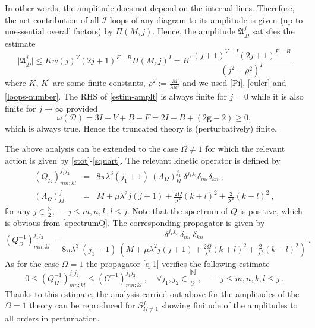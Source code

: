 \documentclass[a4paper,11pt,twoside]{article}
\numberwithin{equation}{section}
\theoremstyle{nonumberplain}
\newcounter{and}
\begin{document}
%
In other words, the amplitude does not depend on the internal lines. Therefore, the net contribution of all $\mathcal{I}$ loops of any diagram to its amplitude is given (up to unessential overall factors) by $\Pi(M,j)$. Hence, the amplitude $\mathfrak{A}^j_\mathcal{D}$ satisfies the estimate%
%
\begin{equation}
\vert \mathfrak{A}^j_{\mathcal{D}}\vert \le K w(j)^V (2j+1)^{F-B} \Pi(M,j)^I =K^\prime\frac{(j+1)^{V-I}(2j+1)^{F-B}}{(j^2+\rho^2)^{I}}\label{estim-amplt}
\end{equation}
%
where $K$, $K^\prime$ are some finite constants, $\rho^2:=\frac{M}{\lambda\mu^2}$ and we used \eqref{Pi}, \eqref{euler} and \eqref{loops-number}. The RHS of \eqref{estim-amplt} is always finite for $j=0$ while it is also finite for $j\to\infty$ provided%
%
\begin{equation}
\omega(\mathcal{D})=3I-V+B-F=2I+B+(2\mathbf{g}-2)\ge0,\label{power-count}
\end{equation}
%
which is always true. Hence the truncated theory is (perturbatively) finite.\par%
%

The above analysis can be extended to the case $\Omega\ne1$ for which the relevant action is given by \eqref{stot}-\eqref{squart}. The relevant kinetic operator is defined by%
%
\begin{eqnarray}
\left(Q_\Omega\right)^{j_1j_2}_{mn;kl} &=& 8\pi\lambda^3 (j_1+1) \ \left(\Lambda_\Omega\right)^{j_1}_{kl} \ \delta^{j_1j_2} \delta_{ml} \delta_{kn} \ , \label{propaQ} \\
\left(\Lambda_\Omega\right)^{j}_{kl} &=& M + \mu \lambda^2 j(j+1) + \frac{2\Omega}{\lambda^2} (k+l)^2 + \frac{2}{\lambda^2} (k-l)^2 \ , \label{spectrumQ}
\end{eqnarray}
%
for any $j\in\frac{\mathbb{N}}{2},\ -j\le m,n,k,l\le j$. Note that the spectrum of $Q$ is positive, which is obvious from \eqref{spectrumQ}. The corresponding propagator is given by%
%
\begin{equation}
\left(Q_\Omega^{-1}\right)^{j_1j_2}_{mn;kl} = 
\frac{ \delta^{j_1j_2} \ \delta_{ml} \ \delta_{kn}}{8\pi\lambda^3 \ (j_1+1) \ \left(M + \mu \lambda^2 j(j+1) + \frac{2\Omega}{\lambda^2} (k+l)^2 + \frac{2}{\lambda^2} (k-l)^2\right) } \ . \label{q-1}
\end{equation}
%
As for the case $\Omega=1$ the propagator \eqref{q-1} verifies the following estimate%
%
\begin{equation}
0\le \left(Q_\Omega^{-1}\right)^{j_1j_2}_{mn;kl}\le(G^{-1})^{j_1j_2}_{mn;kl} \ , \quad \forall j_1,j_2\in\frac{\mathbb{N}}{2} \ , \quad -j\le m,n,k,l\le j \ . \label{envelop-number2}
\end{equation}
%
Thanks to this estimate, the analysis carried out above for the amplitudes of the $\Omega=1$ theory can be reproduced for $S^f_{\Omega\ne1}$ showing finitude of the amplitudes to all orders in perturbation.\par%
\end{document}

